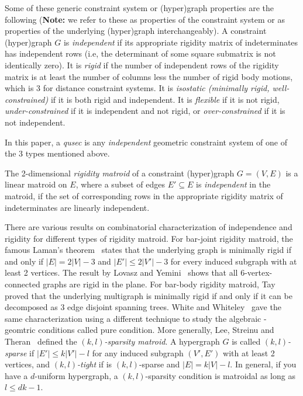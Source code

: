 Some of these generic constraint system or 
(hyper)graph properties are the following ({\bf Note:} we refer to these as
properties of the constraint system or as properties of the underlying
(hyper)graph interchangeably).
%
A constraint (hyper)graph $G$ is {\em independent} if its appropriate rigidity matrix of indeterminates  
has independent rows
(i.e, the determinant of some square submatrix is not
identically zero). 
It is {\em rigid} if the number of independent rows of the rigidity matrix is
at least the number of columns less the number of rigid body motions, 
which is 3 for distance constraint systems. 
It is {\em isostatic (minimally rigid, well-constrained)} 
if it is both rigid and independent. 
It is {\em flexible} if it is not rigid, {\em under-constrained} if it is independent and not rigid, or {\em over-constrained} if it is not independent.


In this paper, a {\em qusec} is any {\em independent} geometric 
constraint system of one of the 3
types mentioned above.


The 2-dimensional {\em rigidity matroid} of a constraint (hyper)graph $G = (V,E)$ is a linear matroid  on $E$, 
where a subset of edges $E' \subseteq E$ is {\em independent} in the matroid, 
if the set of corresponding rows in the appropriate rigidity matrix of indeterminates are linearly independent. 

There are various results on combinatorial characterization of independence and rigidity
for different types of  rigidity matroid. 
For bar-joint rigidity matroid, 
the famous Laman's theorem~\cite{???} states that the underlying graph
is minimally rigid if and only if $|E| = 2|V|-3$ and $|E'| \le 2|V'|-3$ for every induced subgraph with at least 2 vertices. 
The result by Lovasz and Yemini~\cite{???} shows that all 6-vertex-connected graphs are rigid in the plane. 
For bar-body rigidity matroid,
Tay~\cite{???} proved that
the underlying multigraph is minimally rigid if and only if it can be decomposed as $3$ edge disjoint spanning trees. 
White and Whiteley~\cite{???} gave the same characterization using a different technique to study the algebraic - geomtric conditions called pure condition.
More generally, 
Lee, Streinu and Theran~\cite{???} defined the {\em $(k,l)$-sparsity matroid}.
A hypergraph $G$ is called {\em $(k,l)$-sparse} if $|E'| \le k|V'| - l$ for any induced subgraph $(V',E')$ with at least 2 vertices, 
and {\em $(k,l)$-tight} if is $(k,l)$-sparse and $|E| = k|V| - l$. 
In general, if you have a $d$-uniform hypergraph, a $(k,l)$-sparsity
condition is matroidal as long as $l \le dk-1$. 

